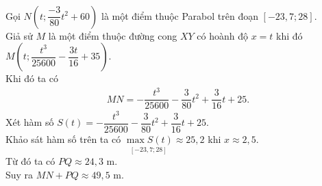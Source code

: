 \begin{ex}
{\begin{align*}
	\end{align*}
	Gọi $N \left(t; \dfrac{-3}{80}t^2 + 60 \right)$ là một điểm thuộc Parabol trên đoạn $\left[-23{,}7; 28 \right]$.\\
	Giả sử $M$ là một điểm thuộc đường cong $XY$ có hoành độ $x = t$ khi đó $M \left(t; \dfrac{t^3}{25600} - \dfrac{3t}{16} + 35\right)$.\\
	Khi đó ta có
	\begin{align*}
		MN = -\dfrac{t^3}{25600} - \dfrac{3}{80}t^2 + \dfrac{3}{16}t + 25.
	\end{align*}
	Xét hàm số $S(t) = -\dfrac{t^3}{25600} - \dfrac{3}{80}t^2 + \dfrac{3}{16}t + 25$.\\
	Khảo sát hàm số trên ta có $ \underset{\left[-23{,}7; 28 \right]}{\max S(t)} \approx 25{,}2$ khi $x \approx 2{,}5$.\\
	Từ đó ta có $PQ \approx 24{,}3$ m.\\
	Suy ra $MN + PQ \approx 49{,}5$ m.
	}
\end{ex}

%

